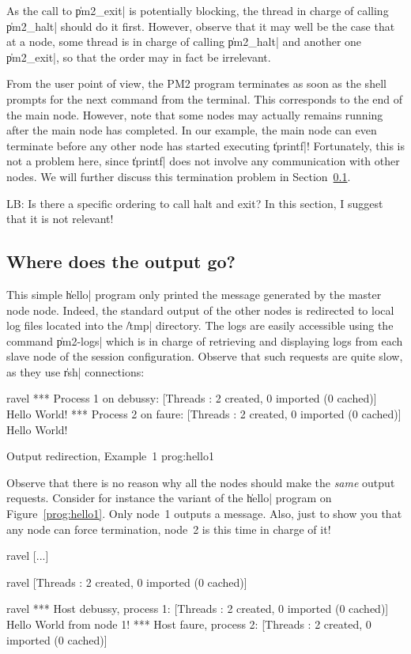 As the call to \|pm2_exit| is potentially blocking, the thread in
charge of calling \|pm2_halt| should do it first. However, observe
that it may well be the case that at a node, some thread is in charge
of calling \|pm2_halt| and another one \|pm2_exit|, so that the order
may in fact be irrelevant.

From the user point of view, the PM2 program terminates as soon as the
shell prompts for the next command from the terminal. This corresponds
to the end of the main node. However, note that some nodes may
actually remains running after the main node has completed.  In our example,
the main node can even terminate before any other node has started
executing \|tprintf|! Fortunately, this is not a problem here, since
\|tprintf| does not involve any communication with other nodes. We will
further discuss this termination problem in Section~\ref{sec:output}.

\begin{note}
  LB: Is there a specific ordering to call halt and exit? In this
  section, I suggest that it is not relevant!
\end{note}


\subsection{Where does the output go?}
\label{sec:output}

This simple \|hello| program only printed the message generated by the
master node node. Indeed, the standard output of the other nodes is
redirected to local log files located into the \|/tmp| directory.  The
logs are easily accessible using the command \|pm2-logs| which is in
charge of retrieving and displaying logs from each slave node of the
session configuration. Observe that such requests are quite slow, as
they use \|rsh| connections:
\begin{shell}
ravel%
*** Process 1 on debussy:
[Threads : 2 created, 0 imported (0 cached)]
Hello World!
*** Process 2 on faure:
[Threads : 2 created, 0 imported (0 cached)]
Hello World!
\end{shell}

 {Output redirection,
  Example~1} {prog:hello1}

Observe that there is no reason why all the nodes should make the
\emph{same} output requests. Consider for instance the variant of the
\|hello| program on Figure~\ref{prog:hello1}. Only node~1 outputs a
message.  Also, just to show you that any node can force termination,
node~2 is this time in charge of it!
\begin{shell}
ravel%
[...]

ravel%
[Threads : 2 created, 0 imported (0 cached)]

ravel%
*** Host debussy, process 1:
[Threads : 2 created, 0 imported (0 cached)]
Hello World from node 1!
*** Host faure, process 2:
[Threads : 2 created, 0 imported (0 cached)]
\end{shell}

